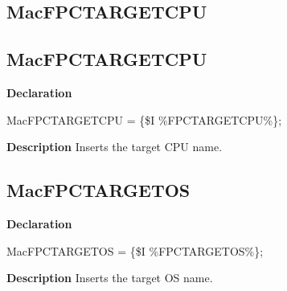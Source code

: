 \documentclass{report}
\newif\ifpdf
\begin{document}
\subsection*{\large{\textbf{MacFPCTARGETCPU}}\normalsize\hspace{1ex}\hrulefill}
\else
\subsection*{MacFPCTARGETCPU}
\fi
\label{ok_include_environment-MacFPCTARGETCPU}
\begin{list}{}{
\setlength{\itemindent}{0cm}
\setlength{\listparindent}{0cm}
\setlength{\leftmargin}{\evensidemargin}
\addtolength{\leftmargin}{\tmplength}
\settowidth{\labelsep}{X}
\addtolength{\leftmargin}{\labelsep}
\setlength{\labelwidth}{\tmplength}
}
\item[\textbf{Declaration}\hfill]
\ifpdf
\begin{flushleft}
\fi
\begin{ttfamily}
MacFPCTARGETCPU = {\{}{\$}I {\%}FPCTARGETCPU{\%}{\}};\end{ttfamily}

\ifpdf
\end{flushleft}
\fi

\par
\item[\textbf{Description}]
Inserts the target CPU name.

\end{list}
\ifpdf
\subsection*{\large{\textbf{MacFPCTARGETOS}}\normalsize\hspace{1ex}\hrulefill}
\else
\subsection*{MacFPCTARGETOS}
\fi
\label{ok_include_environment-MacFPCTARGETOS}
\begin{list}{}{
\setlength{\itemindent}{0cm}
\setlength{\listparindent}{0cm}
\setlength{\leftmargin}{\evensidemargin}
\addtolength{\leftmargin}{\tmplength}
\settowidth{\labelsep}{X}
\addtolength{\leftmargin}{\labelsep}
\setlength{\labelwidth}{\tmplength}
}
\item[\textbf{Declaration}\hfill]
\ifpdf
\begin{flushleft}
\fi
\begin{ttfamily}
MacFPCTARGETOS = {\{}{\$}I {\%}FPCTARGETOS{\%}{\}};\end{ttfamily}

\ifpdf
\end{flushleft}
\fi

\par
\item[\textbf{Description}]
Inserts the target OS name.

\end{list}
\ifpdf
\end{document}
